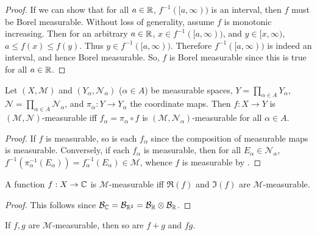 \begin{proof}
    If we can show that for all $a \in \mathbb{R}$, $f^{-1}([a, \infty))$ is an interval, then $f$ must be Borel measurable.
    Without loss of generality, assume $f$ is monotonic increasing.
    Then for an arbitrary $a \in \mathbb{R}$, $x \in f^{-1}([a, \infty))$, and $y \in [x, \infty)$, $a \le f(x) \le f(y)$.
    Thus $y \in  f^{-1}([a, \infty))$.
    Therefore $f^{-1}([a, \infty))$ is indeed an interval, and hence Borel measurable.
    So, $f$ is Borel measurable since this is true for all $a \in \mathbb{R}$.
\end{proof}

\begin{proposition}
    Let $(X, \mathcal{M})$ and $(Y_{\alpha}, \mathcal{N}_{\alpha})$ ($\alpha \in A$) be measurable spaces, $Y = \prod_{\alpha \in A} Y_{\alpha}$, $\mathcal{N} = \prod_{\alpha \in A} \mathcal{N}_{\alpha}$, and $\pi_{\alpha}: Y \to Y_{\alpha}$ the coordinate maps. Then $f: X \to Y$ is $(\mathcal{M}, \mathcal{N})$-measurable iff $f_{\alpha} = \pi_{\alpha} \circ f$ is $(\mathcal{M}, \mathcal{N}_{\alpha})$-measurable for all $\alpha \in A$.
\end{proposition}

\begin{proof}
    If $f$ is measurable, so is each $f_{\alpha}$ since the composition of measurable maps is measurable.
    Conversely, if each $f_{\alpha}$ is measurable, then for all $E_{\alpha} \in \mathcal{N}_{\alpha}$, $f^{-1}(\pi_{\alpha}^{-1}(E_{\alpha})) = f_{\alpha}^{-1}(E_{\alpha}) \in \mathcal{M}$, whence $f$ is measurable by .
\end{proof}

\begin{corollary}
    A function $f: X \to \mathbb{C}$ is $\mathcal{M}$-measurable iff $\Re(f)$ and $\Im(f)$ are $\mathcal{M}$-measurable.
\end{corollary}

\begin{proof}
    This follows since $\mathcal{B}_{\mathbb{C}} = \mathcal{B}_{\mathbb{R}^2} = \mathcal{B}_{\mathbb{R}} \otimes \mathcal{B}_{\mathbb{R}}$. 
\end{proof}

\begin{proposition}
    If $f,g$ are $\mathcal{M}$-measurable, then so are $f+g$ and $f g$.
\end{proposition}

